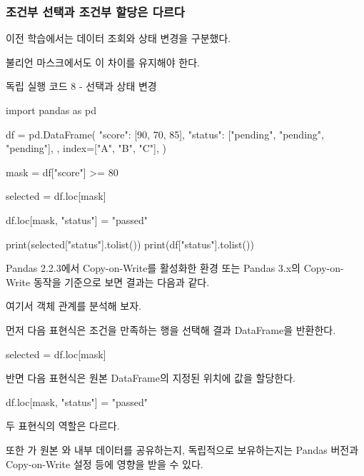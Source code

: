 \subsubsection{조건부 선택과 조건부 할당은 다르다}

이전 학습에서는 데이터 조회와 상태 변경을 구분했다.

불리언 마스크에서도 이 차이를 유지해야 한다.

\begin{dhknote}
\begin{dhksmry}[centered]
독립 실행 코드 8 - 선택과 상태 변경
\end{dhksmry}
\end{dhknote}

\begin{dhkcode}
import pandas as pd

df = pd.DataFrame(
    {
        "score": [90, 70, 85],
        "status": ["pending", "pending", "pending"],
    },
    index=["A", "B", "C"],
)

mask = df["score"] >= 80

selected = df.loc[mask]

df.loc[mask, "status"] = "passed"

print(selected["status"].tolist())
print(df["status"].tolist())
\end{dhkcode}

Pandas 2.2.3에서 Copy-on-Write를 활성화한 환경 또는 Pandas 3.x의 Copy-on-Write 동작을 기준으로 보면 결과는 다음과 같다.

\begin{dhkzsh}
\end{dhkzsh}

여기서 객체 관계를 분석해 보자.

먼저 다음 표현식은 조건을 만족하는 행을 선택해 결과 DataFrame을 반환한다.

\begin{dhkcode}
selected = df.loc[mask]
\end{dhkcode}

반면 다음 표현식은 원본 DataFrame의 지정된 위치에 값을 할당한다.

\begin{dhkcode}
df.loc[mask, "status"] = "passed"
\end{dhkcode}

두 표현식의 역할은 다르다.

또한 가 원본 와 내부 데이터를 공유하는지, 독립적으로 보유하는지는 Pandas 버전과 Copy-on-Write 설정 등에 영향을 받을 수 있다.

